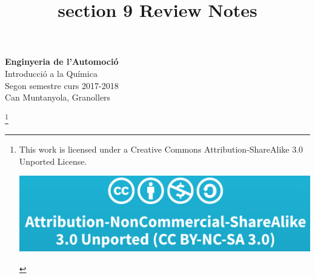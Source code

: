 \usepackage[utf8]{inputenc}
\usepackage[catalan]{babel}
\usepackage{lmodern}
\usepackage{amsmath,amsthm,amsfonts,amssymb,amscd}
\usepackage{multirow,booktabs}
\usepackage[table]{xcolor}
\usepackage{fullpage}
\usepackage{lastpage}
\usepackage{graphicx}
\usepackage{enumitem}
\usepackage{fancyhdr}
\usepackage{mathrsfs}
\usepackage{wrapfig}
\usepackage{setspace}
\usepackage{calc}
\usepackage{multicol}
\usepackage{gensymb}

\usepackage{cancel}
\usepackage[retainorgcmds]{IEEEtrantools}
\usepackage[margin=3cm]{geometry}
\usepackage{amsmath}
\newlength{\tabcont}
\setlength{\parindent}{0.0in}
\setlength{\parskip}{0.05in}
\usepackage{empheq}
\usepackage{framed}
\usepackage{mdframed}

\usepackage[most]{tcolorbox}
\usepackage{chemfig,chemmacros}
\usepackage{chemformula}

\usepackage{tcolorbox}
\usepackage{url}
  \let\oldurl\url
\usepackage{hyperref}
  \let\linkurl\url
  \let\url\oldurl
  
\usepackage[
backend=biber,
citestyle=numeric-comp 
]{biblatex}



\renewcommand*\printatom[1]{\ensuremath{\mathsf{#1}}}
\setatomsep{2em}
\setdoublesep{.6ex}
\parindent 0in
\parskip 12pt
\geometry{margin=1in, headsep=0.25in}
\theoremstyle{definition}
\newtheorem{defn}{Definition}
\newtheorem{reg}{Rule}
\newtheorem{exer}{Exercise}
\newtheorem{note}{Note}


\setcounter{subsection}{8}
\title{section 9 Review Notes}

\thispagestyle{empty}

\begin{center}
{\LARGE \bf Enginyeria de l'Automoció}\\
{\large Introducció a la Química}\\
Segon semestre curs 2017-2018\\
Can Muntanyola, Granollers
\end{center}

\footnote{This work is licensed under a Creative Commons Attribution-ShareAlike 3.0 Unported License.
  \begin{center}
    \includegraphics[scale=0.1]{figures/CC-BY-NC-SA.png}
  \end{center}}
\tableofcontents

